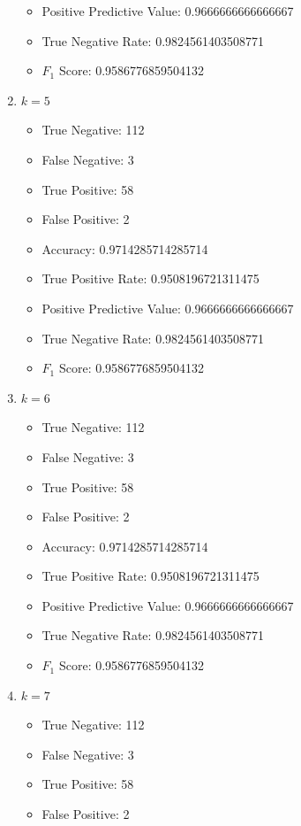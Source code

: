 \documentclass[12pt]{article}
\begin{document}
\begin{enumerate}
\begin{itemize}
        	\item Positive Predictive Value: 0.9666666666666667
        	\item True Negative Rate: 0.9824561403508771
        	\item $F_1$ Score: 0.9586776859504132
        \end{itemize}
        \item $k = 5$
        \begin{itemize}
        	\item True Negative: 112
        	\item False Negative: 3
        	\item True Positive: 58
        	\item False Positive: 2
        	\item Accuracy: 0.9714285714285714
        	\item True Positive Rate: 0.9508196721311475
        	\item Positive Predictive Value: 0.9666666666666667
        	\item True Negative Rate: 0.9824561403508771
        	\item $F_1$ Score: 0.9586776859504132
        \end{itemize}
        \item $k = 6$
        \begin{itemize}
        	\item True Negative: 112
        	\item False Negative: 3
        	\item True Positive: 58
        	\item False Positive: 2
        	\item Accuracy: 0.9714285714285714
        	\item True Positive Rate: 0.9508196721311475
        	\item Positive Predictive Value: 0.9666666666666667
        	\item True Negative Rate: 0.9824561403508771
        	\item $F_1$ Score: 0.9586776859504132
        \end{itemize}
        \item $k = 7$
        \begin{itemize}
        	\item True Negative: 112
        	\item False Negative: 3
        	\item True Positive: 58
        	\item False Positive: 2

\end{itemize}
\end{enumerate}
\end{document}
